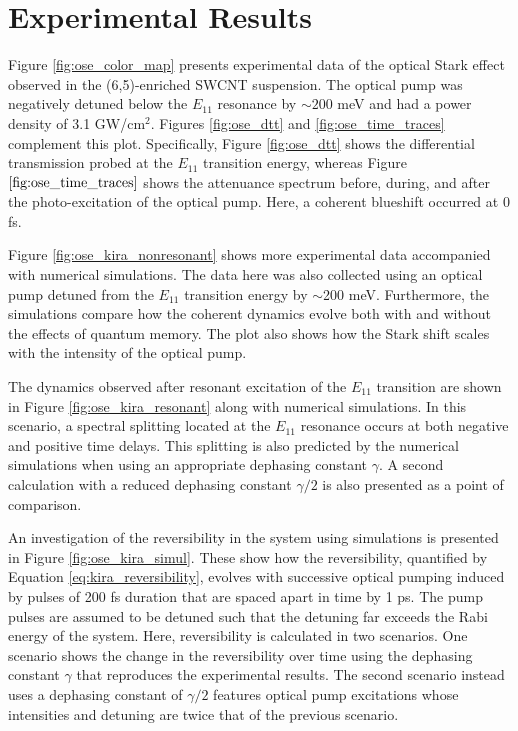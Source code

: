 \section{Experimental Results}

Figure \ref{fig:ose_color_map} presents experimental data of the optical Stark effect observed in the (6,5)-enriched SWCNT suspension. The optical pump was negatively detuned below the $E_{11}$ resonance by $\sim 200$ meV and had a power density of 3.1 GW/cm$^2$. Figures \ref{fig:ose_dtt} and \ref{fig:ose_time_traces} complement this plot. Specifically, Figure \ref{fig:ose_dtt} shows the differential transmission probed at the $E_{11}$ transition energy, whereas Figure $\ref{fig:ose_time_traces}$ shows the attenuance spectrum before, during, and after the photo-excitation of the optical pump. Here, a coherent blueshift occurred at 0 fs.

Figure \ref{fig:ose_kira_nonresonant} shows more experimental data accompanied with numerical simulations. The data here was also collected using an optical pump detuned from the $E_{11}$ transition energy by $\sim$200 meV. Furthermore, the simulations compare how the coherent dynamics evolve both with and without the effects of quantum memory. The plot also shows how the Stark shift scales with the intensity of the optical pump.

The dynamics observed after resonant excitation of the $E_{11}$ transition are shown in Figure \ref{fig:ose_kira_resonant} along with numerical simulations. In this scenario, a spectral splitting located at the $E_{11}$ resonance occurs at both negative and positive time delays. This splitting is also predicted by the numerical simulations when using an appropriate dephasing constant $\gamma$. A second calculation with a reduced dephasing constant $\gamma/2$ is also presented as a point of comparison.

An investigation of the reversibility in the system using simulations is presented in Figure \ref{fig:ose_kira_simul}. These show how the reversibility, quantified by Equation \eqref{eq:kira_reversibility}, evolves with successive optical pumping induced by pulses of 200 fs duration that are spaced apart in time by 1 ps. The pump pulses are assumed to be detuned such that the detuning far exceeds the Rabi energy of the system. Here, reversibility is calculated in two scenarios. One scenario shows the change in the reversibility over time using the dephasing constant $\gamma$ that reproduces the experimental results. The second scenario instead uses a dephasing constant of $\gamma/2$ features optical pump excitations whose intensities and detuning are twice that of the previous scenario.

